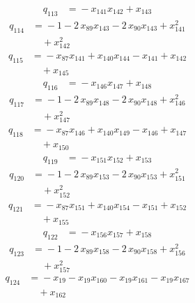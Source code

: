 \documentclass[11pt]{article}
\theoremstyle{remark}\newtheorem{remark}[theorem]{Remark}
\begin{document}
\begin{align*}
q_{113} &={}-x_{141}x_{142} +x_{143}
\end{align*}
\begin{align*}
q_{114} &={}-1 -2\,x_{89}x_{143} -2\,x_{90}x_{143} +x_{141}^{2}\\
&\quad +x_{142}^{2}
\end{align*}
\begin{align*}
q_{115} &={}-x_{87}x_{141} +x_{140}x_{144} -x_{141} +x_{142}\\
&\quad +x_{145}
\end{align*}
\begin{align*}
q_{116} &={}-x_{146}x_{147} +x_{148}
\end{align*}
\begin{align*}
q_{117} &={}-1 -2\,x_{89}x_{148} -2\,x_{90}x_{148} +x_{146}^{2}\\
&\quad +x_{147}^{2}
\end{align*}
\begin{align*}
q_{118} &={}-x_{87}x_{146} +x_{140}x_{149} -x_{146} +x_{147}\\
&\quad +x_{150}
\end{align*}
\begin{align*}
q_{119} &={}-x_{151}x_{152} +x_{153}
\end{align*}
\begin{align*}
q_{120} &={}-1 -2\,x_{89}x_{153} -2\,x_{90}x_{153} +x_{151}^{2}\\
&\quad +x_{152}^{2}
\end{align*}
\begin{align*}
q_{121} &={}-x_{87}x_{151} +x_{140}x_{154} -x_{151} +x_{152}\\
&\quad +x_{155}
\end{align*}
\begin{align*}
q_{122} &={}-x_{156}x_{157} +x_{158}
\end{align*}
\begin{align*}
q_{123} &={}-1 -2\,x_{89}x_{158} -2\,x_{90}x_{158} +x_{156}^{2}\\
&\quad +x_{157}^{2}
\end{align*}
\begin{align*}
q_{124} &={}-x_{19} -x_{19}x_{160} -x_{19}x_{161} -x_{19}x_{167}\\
&\quad +x_{162}
\end{align*}
\end{document}
